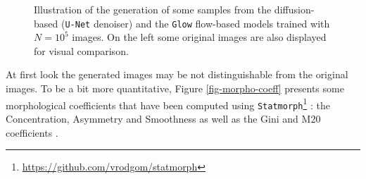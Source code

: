 \documentclass[11pt]{amsart}
\begin{document}
\begin{figure}
\begin{subfigure}[t]{0.30\columnwidth}
\begin{center}
    \end{center}
    \end{subfigure}%
    \begin{subfigure}[t]{0.30\columnwidth}
        \centering
    \end{subfigure}
    \caption{Illustration of the generation of some samples from the diffusion-based (\texttt{U-Net} denoiser) and the \texttt{Glow} flow-based models trained with $N=10^5$ images. On the left some original images are also displayed for visual comparison.}
    \label{fig-Original-Glow-UNet-samples}
\end{figure}
At first look the generated images may be not distinguishable from the original images.
To be a bit more quantitative, Figure \ref{fig-morpho-coeff} presents  some morphological coefficients that have been computed using \texttt{Statmorph}\footnote{\url{https://github.com/vrodgom/statmorph}} \citep{2019MNRAS.483.4140R}: the Concentration, Asymmetry and Smoothness \citep{2000AJ....119.2645B,2003ApJS..147....1C,2004AJ....128..163L}  as well as the Gini and M20 coefficients \citep{2004AJ....128..163L,10.1093/mnras/stv2078}.
\end{document}
